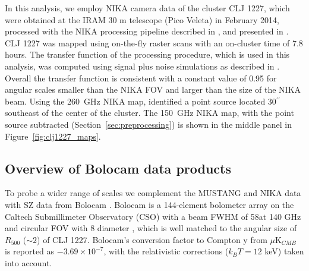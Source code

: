 \documentclass[twocolumn,traditabstract]{aa}
\begin{document}
In this analysis, we employ NIKA camera data of the cluster CLJ 1227, which were obtained at the IRAM 30 m telescope (Pico Veleta)
in February 2014, processed with the NIKA processing pipeline described in \citet{adam2014}, and  presented in \citet{adam2015}.
CLJ 1227 was mapped using on-the-fly raster scans with an on-cluster time of 7.8 hours.
The transfer function of the processing procedure, which is used in this analysis, was computed using signal plus noise simulations as
described in \citet{adam2015}.
Overall the transfer function is consistent with a constant value of 0.95 for angular scales smaller than the NIKA FOV and larger
than the size of the NIKA beam. Using the 260~GHz NIKA map, \citet{adam2015} identified a point source located 30$^{\prime \prime}$
southeast of the center of the cluster. The 150~GHz NIKA map, with the point source subtracted (Section~\ref{sec:preprocessing})
is shown in the middle panel in Figure~\ref{fig:clj1227_maps}.

\subsection{Overview of Bolocam data products}
\label{sec:bolocamobs}

To probe a wider range of scales we complement the MUSTANG and NIKA data with SZ data from Bolocam \citep{glenn1998}. 
Bolocam is a 144-element bolometer
array on the Caltech Submillimeter Observatory (CSO) with a beam FWHM of 58\asecs at 140 GHz and circular FOV with 8\amins 
diameter \citep{glenn1998,haig2004}, which is well matched to the angular size of $R_{500}$ ($\sim 2$\amin) of CLJ 1227. 
Bolocam's conversion factor to Compton y from $\mu$K$_{CMB}$ is reported as $-3.69 \times 10^{-7}$, with the relativistic
corrections ($k_B T = 12$ keV) taken into account.
\end{document}
